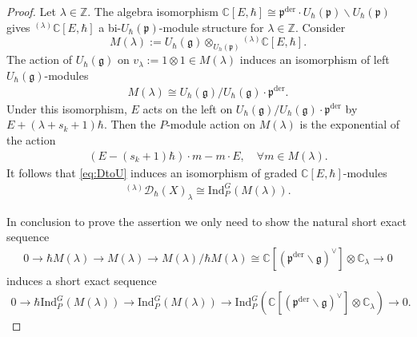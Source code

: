 \documentclass[11pt,a4paper,usenames,dvipsnames,reqno]{amsart}
\numberwithin{equation}{section}
\newcommand{\cc}{\mathbb C}
\newcommand{\zz}{\mathbb Z}
\newcommand{\fg}{\mathfrak g}
\newcommand{\fp}{\mathfrak p}
\newcommand{\der}{\mathrm{der}}
\theoremstyle{definition}
\theoremstyle{remark}
\begin{document}
\begin{proof}
Let $\lambda\in \zz$. The algebra isomorphism $\cc[E,\hbar]\cong \fp^{\mathrm{der}}\cdot U_{\hbar}(\fp)\backslash U_{\hbar}(\fp)$ gives  $^{(\lambda)}\cc[E,\hbar]$ a bi-$U_{\hbar}(\mathfrak{p})$-module structure for $\lambda\in \zz.$ Consider $$M(\lambda):=U_\hbar(\fg)\otimes_{{U_h(\fp)}}{}^{(\lambda)}\cc[E,\hbar].$$  The action of $U_\hbar(\fg)$ on $v_\lambda:=1\otimes 1\in M(\lambda)$ induces an isomorphism of left $U_\hbar(\fg)$-modules
\begin{align*}
    M(\lambda)\cong U_{\hbar}(\fg)/U_{\hbar}(\fg)\cdot \fp^{\mathrm{der}}.
\end{align*}
Under this isomorphism, $E$ acts on the left on $U_{\hbar}(\fg)/U_{\hbar}(\fg)\cdot \fp^{\mathrm{der}}$ by $E+(\lambda+s_k+1)\hbar.$ Then the $P$-module action on $M(\lambda)$ is the exponential of the action 
\begin{align*}
    (E-(s_k+1)\hbar)\cdot m-m\cdot E, \quad \forall m\in M(\lambda). 
\end{align*}
It follows that \eqref{eq:DtoU} induces an isomorphism of graded $\cc[E,\hbar]$-modules
\begin{align*}
     {}^{(\lambda)}\mathcal{D}_{\hbar}(X)_\lambda\cong \mathrm{Ind}_P^G(M(\lambda)).
\end{align*}

In conclusion to prove the assertion we only need to show the natural short exact sequence
\begin{align*}
    0\longrightarrow \hbar M(\lambda)\longrightarrow M(\lambda)\longrightarrow M(\lambda)/\hbar M(\lambda)\cong \cc[(\fp^\der\backslash \fg)^\lor]\otimes\cc_{\lambda}\longrightarrow 0
\end{align*}
induces a short exact sequence
\begin{align*}
    0\longrightarrow \hbar \mathrm{Ind}_P^G (M(\lambda))\longrightarrow \mathrm{Ind}_P^G(M(\lambda))\longrightarrow \mathrm{Ind}_P^G(\cc[(\fp^\der\backslash \fg)^\lor]\otimes\cc_{\lambda})\longrightarrow 0.
\end{align*}


\end{proof}
\end{document}
